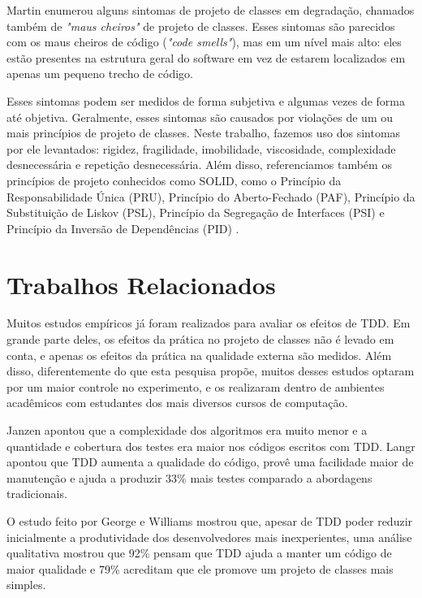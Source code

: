 \documentclass[conference]{IEEEtran}
\begin{document}
Martin \cite{bob-martin} enumerou alguns sintomas de projeto de classes em degradação, 
chamados também de \textit{"maus cheiros"} de projeto de classes. Esses sintomas são parecidos com os 
maus cheiros de código (\textit{"code smells"}), mas em um nível mais alto: eles
estão presentes na estrutura geral do software em vez de estarem localizados
em apenas um pequeno trecho de código.

Esses sintomas podem ser medidos de forma subjetiva e algumas vezes de forma 
até objetiva. Geralmente, esses sintomas são causados por violações de um ou 
mais princípios de projeto de classes.
Neste trabalho, fazemos uso dos sintomas por ele levantados: rigidez, fragilidade, imobilidade, 
viscosidade, complexidade desnecessária e repetição desnecessária. Além disso, referenciamos também
os princípios de projeto conhecidos como SOLID, 
como o Princípio da Responsabilidade Única (PRU), Princípio do Aberto-Fechado (PAF),
Princípio da Substituição de Liskov (PSL), Princípio da Segregação de Interfaces (PSI) e Princípio da
Inversão de Dependências (PID) \cite{bob-martin}.

\section{Trabalhos Relacionados}
\label{cap:trabalhos-relacionados}

Muitos estudos empíricos já foram realizados para avaliar os efeitos de TDD.
Em grande parte deles, os efeitos da prática no projeto de classes não é 
levado em conta, e apenas os efeitos da prática na qualidade externa são medidos.
Além disso, diferentemente
do que esta pesquisa propõe, muitos desses estudos optaram por um
maior controle no experimento, e os realizaram dentro de ambientes acadêmicos 
com estudantes dos mais diversos cursos de computação.

Janzen \cite{janzen-arch-improvement} 
apontou que a complexidade dos algoritmos era muito menor e a quantidade e
cobertura dos testes era maior nos códigos escritos com TDD.
Langr \cite{langr} apontou que TDD aumenta a qualidade do código, provê uma 
facilidade maior de manutenção e ajuda a produzir 33\% mais testes comparado a
abordagens tradicionais.

O estudo feito por George e Williams \cite{george-e-williams} mostrou que,
apesar de TDD poder reduzir inicialmente a produtividade dos desenvolvedores 
mais inexperientes, uma análise
qualitativa mostrou que 92\% pensam que TDD ajuda a manter um
código de maior qualidade e 79\% acreditam que ele promove um projeto 
de classes mais simples.
\end{document}
